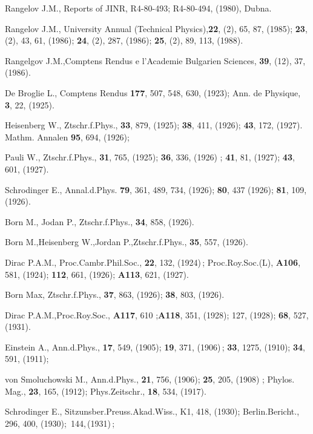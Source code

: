\documentclass[12pt]{article}
\begin{document}
\begin{thebibliography}{99}

 Rangelov J.M., Reports of JINR, R4-80-493; R4-80-494,
(1980), Dubna.

 Rangelov J.M., University Annual (Technical Physics),{\bf 22},
(2), 65, 87, (1985); {\bf 23}, (2), 43, 61, (1986); {\bf 24}, (2), 287, (1986);
{\bf 25}, (2), 89, 113, (1988).

 Rangelgov J.M.,Comptens Rendus e l'Academie Bulgarien
Sciences, {\bf 39}, (12), 37, (1986).

 De Broglie L., Comptens Rendus {\bf 177}, 507, 548, 630, (1923);
Ann. de Physique, {\bf 3}, 22, (1925).

 Heisenberg W., Ztschr.f.Phys., {\bf 33}, 879, (1925); {\bf 38},
411, (1926); {\bf 43}, 172, (1927).  Mathm. Annalen  {\bf95}, 694, (1926);

 Pauli W., Ztschr.f.Phys., {\bf 31}, 765, (1925); {\bf 36}, 336,
(1926) ; {\bf 41}, 81, (1927); {\bf 43}, 601, (1927).

 Schrodinger E., Annal.d.Phys. {\bf 79}, 361, 489, 734, (1926);
 {\bf 80}, 437 (1926); {\bf 81}, 109, (1926).

 Born M., Jodan P., Ztschr.f.Phys., {\bf 34}, 858, (1926).

 Born M.,Heisenberg W.,Jordan P.,Ztschr.f.Phys., {\bf 35}, 557,
(1926).

 Dirac P.A.M., Proc.Cambr.Phil.Soc., {\bf 22}, 132, (1924)\,;
 Proc.Roy.Soc.(L), {\bf A106}, 581, (1924); {\bf 112}, 661, (1926);
 {\bf A113}, 621, (1927).

 Born Max, Ztschr.f.Phys., {\bf 37}, 863, (1926); {\bf 38}, 803,
(1926).

 Dirac P.A.M.,Proc.Roy.Soc., {\bf A117}, 610 ;{\bf A118}, 351,
(1928); 127, (1928); {\bf 68}, 527, (1931).

 Einstein A., Ann.d.Phys., {\bf 17}, 549, (1905); {\bf 19},
371, (1906)\,;  {\bf 33}, 1275, (1910); {\bf 34}, 591, (1911);

 von Smoluchowski M.,  Ann.d.Phys., {\bf 21}, 756, (1906);
{\bf 25}, 205, (1908) ;  Phylos. Mag., {\bf 23}, 165, (1912);
 Phys.Zeitschr., {\bf 18}, 534, (1917).

 Schrodinger E., Sitzunsber.Preuss.Akad.Wiss., K1, 418, (1930);
 Berlin.Bericht., 296, 400, (1930);  \,144,\,(1931)\,;


\end{thebibliography}
\end{document}
